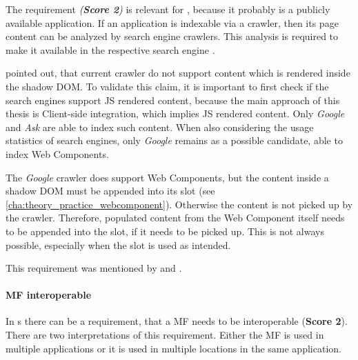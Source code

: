 The requirement \textit{ (\textbf{Score 2})} is relevant for , because it probably is a publicly available application.
If an application is indexable via a crawler, then its page content can be analyzed by search engine crawlers.
This analysis is required to make it available in the respective search engine \cite[p.~1]{Qureshi.2010}.

\textciteMezzalira{} pointed out, that current crawler do not support content which is rendered inside the shadow \ac{DOM}.
To validate this claim, it is important to first check if the search engines support \ac{JS} rendered content, because the main approach of this thesis is Client-side integration, which implies \ac{JS} rendered content.
Only \textit{Google} and \textit{Ask} are able to index such content\footnotemark{}.
When also considering the usage statistics of search engines, only \textit{Google} remains as a possible candidate, able to index Web Components\footnotemark{}.

The \textit{Google} crawler does support Web Components, but the content inside a shadow \ac{DOM} must be appended into its slot (see \ref{cha:theory_practice_webcomponent}).
Otherwise the content is not picked up by the crawler\footnotemark{}.
Therefore, populated content from the Web Component itself needs to be appended into the slot, if it needs to be picked up.
This is not always possible, especially when the slot is used as intended.

This requirement was mentioned by \textciteMezzalira{} and \textcite{Dornenburg.2019}.



\paragraph{\ac{MF} interoperable}\label{cha:requirement_detail_integration_interoperable}

In s there can be a requirement, that a \ac{MF} needs to be interoperable (\textbf{Score 2}).
There are two interpretations of this requirement.
Either the \ac{MF} is used in multiple applications or it is used in multiple locations in the same application.

